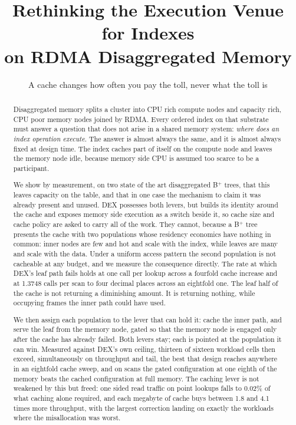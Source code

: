 \documentclass[sigconf,nonacm]{acmart}
\begin{document}
\title{Rethinking the Execution Venue for Indexes\\on RDMA Disaggregated Memory}
\subtitle{A cache changes how often you pay the toll, never what the toll is}

\author{}
\affiliation{\institution{}\country{}}

\begin{abstract}
Disaggregated memory splits a cluster into CPU rich compute nodes and capacity
rich, CPU poor memory nodes joined by RDMA. Every ordered index on that substrate
must answer a question that does not arise in a shared memory system: \emph{where
does an index operation execute}. The answer is almost always the same, and it is
almost always fixed at design time. The index caches part of itself on the
compute node and leaves the memory node idle, because memory side CPU is assumed
too scarce to be a participant.

We show by measurement, on two state of the art disaggregated B$^+$ trees, that
this leaves capacity on the table, and that in one case the mechanism to claim it
was already present and unused. DEX possesses both levers, but builds its identity
around the cache and exposes memory side execution as a switch beside it, so cache
size and cache policy are asked to carry all of the work. They cannot, because a
B$^+$ tree presents the cache with two populations whose residency economics have
nothing in common: inner nodes are few and hot and scale with the index, while
leaves are many and scale with the data. Under a uniform access pattern the second
population is not cacheable at any budget, and we measure the consequence
directly. The rate at which DEX's leaf path fails holds at one call per lookup
across a fourfold cache increase and at 1.3748 calls per scan to four decimal
places across an eightfold one. The leaf half of the cache is not returning a
diminishing amount. It is returning nothing, while occupying frames the inner path
could have used.

We then assign each population to the lever that can hold it: cache the inner
path, and serve the leaf from the memory node, gated so that the memory node is
engaged only after the cache has already failed. Both levers stay; each is pointed
at the population it can win. Measured against DEX's own ceiling, thirteen of
sixteen workload cells then exceed, simultaneously on throughput and tail, the
best that design reaches anywhere in an eightfold cache sweep, and on scans the
gated configuration at one eighth of the memory beats the cached configuration at
full memory. The caching lever is not weakened by this but freed: one sided read
traffic on point lookups falls to 0.02\% of what caching alone required, and each
megabyte of cache buys between 1.8 and 4.1 times more throughput, with the largest
correction landing on exactly the workloads where the misallocation was worst.


\end{abstract}
\end{document}
